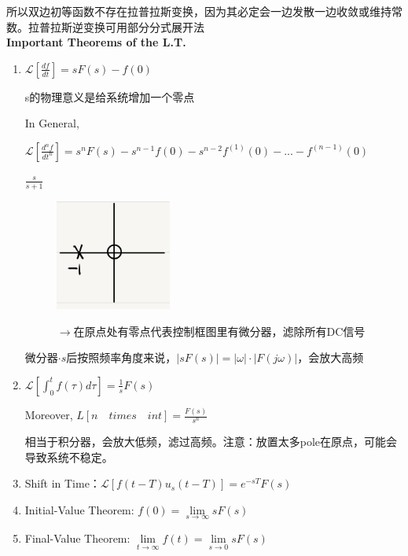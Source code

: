 \documentclass[main.tex]{subfiles}
\begin{document}
所以双边初等函数不存在拉普拉斯变换，因为其必定会一边发散一边收敛或维持常数。拉普拉斯逆变换可用部分分式展开法\\[2pt]

\textbf{Important Theorems of the L.T.}

\begin{enumerate}
    \item $\mathcal{L}[\frac{df}{dt}] = sF(s)-f(0)$
    
    s的物理意义是给系统增加一个零点
    
    In General,

    $\mathcal{L}[\frac{d^nf}{dt^n}]=s^nF(s)-s^{n-1}f(0)-s^{n-2}f^{(1)}(0)-...-f^{(n-1)}(0)$
    
    \begin{example}
    $\frac{s}{s+1}$
    \begin{figure}[H]
        \begin{minipage}{0.5\textwidth}
            \centering
            \includegraphics[width=0.36\textwidth]{img/img_2.1.1.png}
        \end{minipage}
        \hfill
        \begin{minipage}{0.4\textwidth}
            $\rightarrow$在原点处有零点代表控制框图里有微分器，滤除所有DC信号
        \end{minipage}
    \end{figure}
    \end{example}
    微分器$\cdot s$后按照频率角度来说，$|sF(s)| = |\omega|\cdot|F(j\omega)|$，会放大高频

    \item $\mathcal{L}[\int^t_0f(\tau)d\tau] = \frac{1}{s}F(s)$
    
    Moreover, $L[n \quad times\quad int] = \frac{F(s)}{s^n}$

    相当于积分器，会放大低频，滤过高频。注意：放置太多pole在原点，可能会导致系统不稳定。

    \item Shift in Time：$\mathcal{L}[f(t-T)u_s(t-T)]=e^{-sT}F(s)$
    \item Initial-Value Theorem: $f(0) = \lim\limits_{s\to\infty}sF(s)$
    \item Final-Value Theorem: $\lim\limits_{t\to\infty} f(t) = \lim\limits_{s\to 0}sF(s)$


\end{enumerate}
\end{document}
